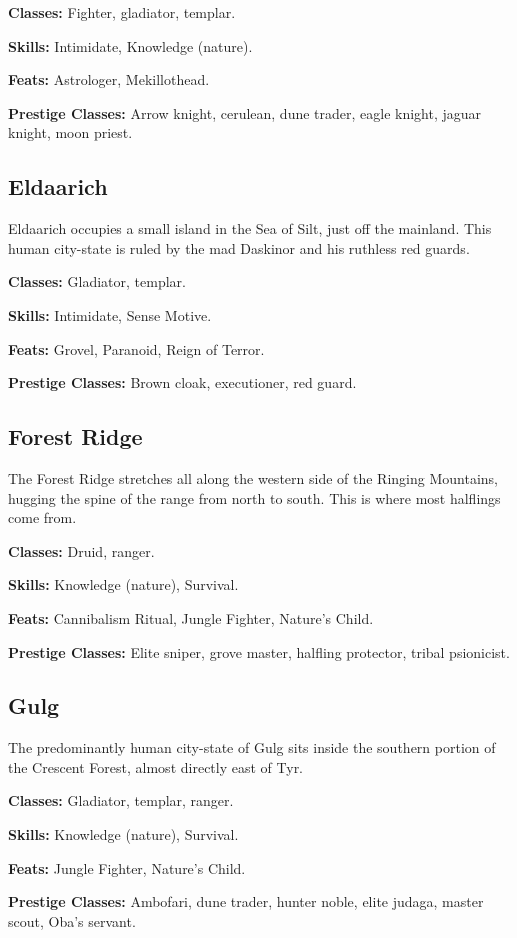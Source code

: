 \textbf{Classes:} Fighter, gladiator, templar.

\textbf{Skills:} Intimidate, Knowledge (nature).

\textbf{Feats:} Astrologer, Mekillothead.

\textbf{Prestige Classes:} Arrow knight, cerulean, dune trader, eagle knight, jaguar knight, moon priest.

\subsection{Eldaarich}
Eldaarich occupies a small island in the Sea of Silt, just off the mainland. This human city-state is ruled by the mad Daskinor and his ruthless red guards.

\textbf{Classes:} Gladiator, templar.

\textbf{Skills:} Intimidate, Sense Motive.

\textbf{Feats:} Grovel, Paranoid, Reign of Terror.

\textbf{Prestige Classes:} Brown cloak, executioner, red guard.


\subsection{Forest Ridge}
The Forest Ridge stretches all along the western side of the Ringing Mountains, hugging the spine of the range from north to south. This is where most halflings come from.

\textbf{Classes:} Druid, ranger.

\textbf{Skills:} Knowledge (nature), Survival.

\textbf{Feats:} Cannibalism Ritual, Jungle Fighter, Nature's Child.

\textbf{Prestige Classes:} Elite sniper, grove master, halfling protector, tribal psionicist.


\subsection{Gulg}
The predominantly human city-state of Gulg sits inside the southern portion of the Crescent Forest, almost directly east of Tyr.

\textbf{Classes:} Gladiator, templar, ranger.

\textbf{Skills:} Knowledge (nature), Survival.

\textbf{Feats:} Jungle Fighter, Nature's Child.

\textbf{Prestige Classes:} Ambofari, dune trader, hunter noble, elite judaga, master scout, Oba's servant.


